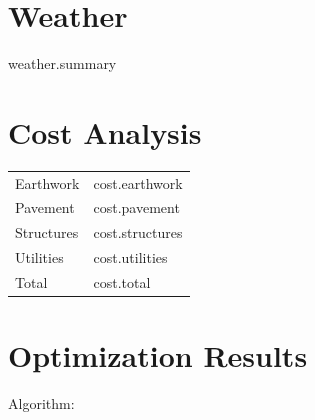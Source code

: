 \documentclass[11pt,a4paper]{article}
\begin{document}
{{{{{{{{%


{%

\section{Weather}

{{ weather.summary }}

{%


{%

\section{Cost Analysis}

\begin{tabular}{ll}

Earthwork &
{{ cost.earthwork }}

\\

Pavement &
{{ cost.pavement }}

\\

Structures &
{{ cost.structures }}

\\

Utilities &
{{ cost.utilities }}

\\

Total &
{{ cost.total }}

\\

\end{tabular}

{%


{%

\section{Optimization Results}

Algorithm:

}}}}}}}}}}}}}
\end{document}
